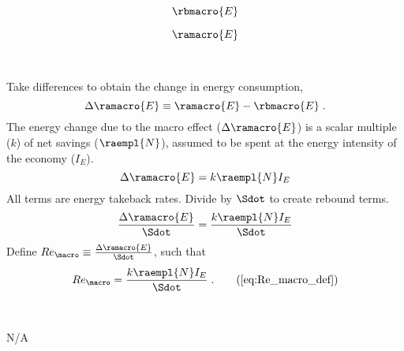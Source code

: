 


\begin{landscape}

\linespread{1}


\sectionsep{}

{
\begin{equation}
  \rbmacro{E}
\end{equation}
}
{
}

\sectionsep{}

{
\begin{equation}
\ramacro{E}
\end{equation}
}
{
}

\sectionsep{}

\derivsection{}
{
~

Take differences to obtain the change in energy consumption,
%
\begin{equation}
  \Delta \ramacro{E} \equiv \ramacro{E} - \rbmacro{E} \; .
\end{equation}
%
The energy change due to the macro effect ($\Delta \ramacro{E}$) 
is a scalar multiple ($k$) of net savings ($\raempl{N}$), 
assumed to be spent at the energy intensity of the economy ($I_E$).
%
\begin{equation}
  \Delta \ramacro{E} = k \raempl{N} I_E
\end{equation}
%
All terms are energy takeback rates.
Divide by $\Sdot$
to create rebound terms.
%
\begin{equation}
  \frac{\Delta \ramacro{E}}{\Sdot} = \frac{k \raempl{N} I_E}{\Sdot}
\end{equation}
%
Define 
$Re_{\macro} \equiv \frac{\Delta \ramacro{E}}{\Sdot}$, 
such that
%
\begin{equation}
  Re_{\macro} = \frac{k \raempl{N} I_E}{\Sdot} \; . \tag{\ref{eq:Re_macro_def}}
\end{equation}
%
}
{
~
\centering

N/A
}
\end{landscape}

\restoregeometry

